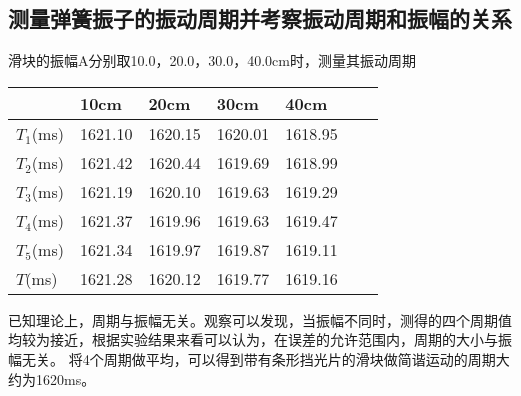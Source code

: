 \documentclass[11pt,a4paper]{article}
\begin{document}
    \subsection{测量弹簧振子的振动周期并考察振动周期和振幅的关系}
    滑块的振幅A分别取10.0，20.0，30.0，40.0cm时，测量其振动周期
    \begin{table}[H]
        \centering
        \begin{tabular}{|l|l|l|l|l|l|l|}
        \hline
             & 10cm & 20cm &30cm&40cm \\ \hline
            $T_1$(ms) & 1621.10 & 1620.15 &1620.01&1618.95\\ \hline
            $T_2$(ms) & 1621.42 & 1620.44 &1619.69&1618.99\\ \hline
            $T_3$(ms) & 1621.19 & 1620.10 &1619.63&1619.29\\ \hline
            $T_4$(ms) &1621.37  &1619.96  &1619.63&1619.47\\ \hline
            $T_5$(ms) &1621.34  &1619.97  &1619.87&1619.11\\ \hline
            $T$(ms)   &1621.28  &1620.12  &1619.77&1619.16\\ \hline
        \end{tabular}
    \end{table}
    已知理论上，周期与振幅无关。观察可以发现，当振幅不同时，测得的四个周期值均较为接近，根据实验结果来看可以认为，在误差的允许范围内，周期的大小与振幅无关。
    将4个周期做平均，可以得到带有条形挡光片的滑块做简谐运动的周期大约为1620ms。
\end{document}
